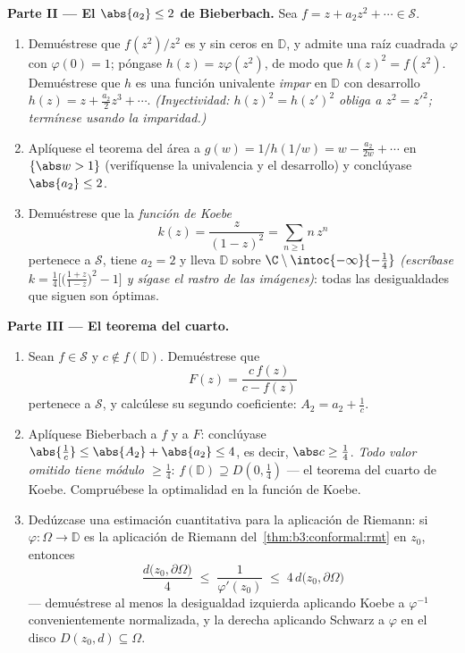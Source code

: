 \begin{problem}
\medskip
\noindent\textbf{Parte II --- El $\abs{a_2} \leq
2$ de Bieberbach.} Sea $f = z + a_2z^2 + \cdots \in \mathcal S$.
\begin{enumerate}[resume]
  \item Demuéstrese que $f(z^2)/z^2$ es
   y sin ceros en
  $\mathbb D$, y admite una raíz cuadrada
   $\varphi$ con
  $\varphi(0) = 1$; póngase $h(z) =
        z\varphi(z^2)$, de modo que $h(z)^2 = f(z^2)$. Demuéstrese que
  $h$ es una función univalente \emph{impar} en $\mathbb
        D$ con desarrollo $h(z) = z + \frac{a_2}2z^3 +
        \cdots$. \emph{(Inyectividad: $h(z)^2 = h(z')^2$ obliga a
  $z^2 = z'^2$; termínese usando la imparidad.)} \item Aplíquese el
  teorema del área a $g(w) = 1/h(1/w) = w -
        \frac{a_2}{2w} + \cdots$ en $\{\abs w > 1\}$ (verifíquense la
  univalencia y el desarrollo) y conclúyase
        $\abs{a_2} \leq 2$.
  \item Demuéstrese que la \emph{función de Koebe}
        \[
        k(z) = \frac{z}{(1 - z)^2} = \sum_{n\geq1}n\,z^n
        \]
        pertenece a $\mathcal S$, tiene $a_2 = 2$ y lleva $\mathbb D$
        sobre $\C\setminus\intoc{-\infty}{-\frac14}$ \emph{(escríbase
        $k = \frac14\bigl[\bigl(\frac{1+z}{1 -
        z}\bigr)^2 - 1\bigr]$ y sígase el rastro de las imágenes)}:
        todas las desigualdades que siguen son óptimas.
\end{enumerate}

\medskip
\noindent\textbf{Parte III --- El teorema del cuarto.}
\begin{enumerate}[resume]
  \item Sean $f \in \mathcal S$ y $c \notin f(\mathbb D)$. Demuéstrese
  que
        \[
        F(z) = \frac{c\,f(z)}{c - f(z)}
        \]
        pertenece a $\mathcal S$, y calcúlese su segundo coeficiente:
        $A_2 = a_2 + \frac1c$. \item Aplíquese Bieberbach a $f$ y a $F$:
        conclúyase
        $\abs{\frac1c} \leq \abs{A_2} + \abs{a_2} \leq 4$,
        es decir, $\abs c \geq \frac14$. \emph{Todo valor omitido tiene
        módulo $\geq \frac14$}: $f(\mathbb D) \supseteq
        D(0, \frac14)$ --- el teorema del cuarto de Koebe. Compruébese
        la optimalidad en la función de Koebe. \item Dedúzcase una
        estimación cuantitativa para la aplicación de Riemann: si
        $\varphi \colon \Omega \to \mathbb D$ es la aplicación de
        Riemann del~\cref{thm:b3:conformal:rmt} en $z_0$, entonces
        \[
        \frac{d\bigl(z_0, \partial\Omega\bigr)}{4}
        \;\leq\; \frac1{\varphi'(z_0)} \;\leq\;
        4\,d\bigl(z_0, \partial\Omega\bigr)
        \]
        --- demuéstrese al menos la desigualdad izquierda aplicando
        Koebe a $\varphi^{-1}$ convenientemente normalizada, y la
        derecha aplicando Schwarz a $\varphi$ en el disco
        $D(z_0, d) \subseteq \Omega$.
\end{enumerate}


\end{problem}
